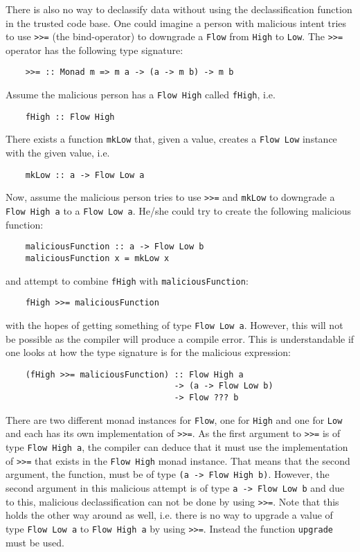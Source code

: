 There is also no way to declassify data without using the declassification function in the trusted code base. One could imagine a person with malicious intent tries to use {\tt >>=} (the bind-operator) to downgrade a {\tt Flow} from {\tt High} to {\tt Low}. The {\tt >>=} operator has the following type signature:
\begin{verbatim}
    >>= :: Monad m => m a -> (a -> m b) -> m b
\end{verbatim}
Assume the malicious person has a {\tt Flow High} called {\tt fHigh}, i.e.
\begin{verbatim}
    fHigh :: Flow High
\end{verbatim}
There exists a function {\tt mkLow} that, given a value, creates a {\tt Flow Low} instance with the given value, i.e.
\begin{verbatim}
    mkLow :: a -> Flow Low a
\end{verbatim}
Now, assume the malicious person tries to use {\tt >>=} and {\tt mkLow} to downgrade a {\tt Flow High a} to a {\tt Flow Low a}. He/she could try to create the following malicious function:
\begin{verbatim}
    maliciousFunction :: a -> Flow Low b
    maliciousFunction x = mkLow x
\end{verbatim}
and attempt to combine {\tt fHigh} with {\tt maliciousFunction}:
\begin{verbatim}
    fHigh >>= maliciousFunction
\end{verbatim}
with the hopes of getting something of type {\tt Flow Low a}. However, this will not be possible as the compiler will produce a compile error. This is understandable if one looks at how the type signature is for the malicious expression:
\begin{verbatim}
    (fHigh >>= maliciousFunction) :: Flow High a
                                  -> (a -> Flow Low b)
                                  -> Flow ??? b
\end{verbatim}
There are two different monad instances for {\tt Flow}, one for {\tt High} and one for {\tt Low} and each has its own implementation of {\tt >>=}. As the first argument to {\tt >>=} is of type {\tt Flow High a}, the compiler can deduce that it must use the implementation of {\tt >>=} that exists in the {\tt Flow High} monad instance. That means that the second argument, the function, must be of type {\tt (a -> Flow High b)}. However, the second argument in this malicious attempt is of type {\tt a -> Flow Low b} and due to this, malicious declassification can not be done by using {\tt >>=}. Note that this holds the other way around as well, i.e. there is no way to upgrade a value of type {\tt Flow Low a} to {\tt Flow High a} by using {\tt >>=}. Instead the function {\tt upgrade} must be used.

